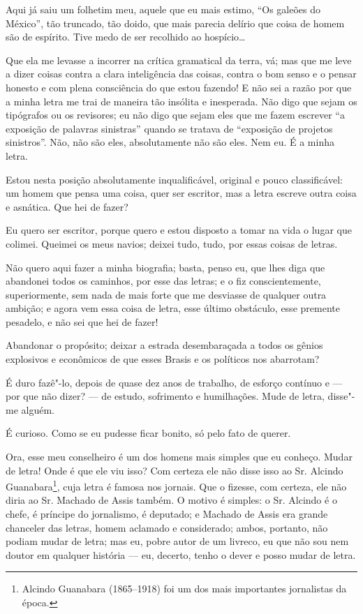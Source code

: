 Aqui já saiu um folhetim meu, aquele que eu mais estimo, ``Os galeões do
México'', tão truncado, tão doido, que mais parecia delírio que coisa de
homem são de espírito. Tive medo de ser recolhido ao hospício\ldots{}

Que ela me levasse a incorrer na crítica gramatical da terra, vá; mas
que me leve a dizer coisas contra a clara inteligência das coisas,
contra o bom senso e o pensar honesto e com plena consciência do que
estou fazendo! E não sei a razão por que a minha letra me trai de
maneira tão insólita e inesperada. Não digo que sejam os tipógrafos ou
os revisores; eu não digo que sejam eles que me fazem escrever ``a
exposição de palavras sinistras'' quando se tratava de ``exposição de
projetos sinistros''. Não, não são eles, absolutamente não são eles. Nem
eu. É a minha letra.

Estou nesta posição absolutamente inqualificável, original e pouco
classificável: um homem que pensa uma coisa, quer ser escritor, mas a
letra escreve outra coisa e asnática. Que hei de fazer?

Eu quero ser escritor, porque quero e estou disposto a tomar na vida o
lugar que colimei. Queimei os meus navios; deixei tudo, tudo, por essas
coisas de letras.

Não quero aqui fazer a minha biografia; basta, penso eu, que lhes diga
que abandonei todos os caminhos, por esse das letras; e o fiz
conscientemente, superiormente, sem nada de mais forte que me desviasse
de qualquer outra ambição; e agora vem essa coisa de letra, esse último
obstáculo, esse premente pesadelo, e não sei que hei de fazer!

Abandonar o propósito; deixar a estrada desembaraçada a todos os gênios
explosivos e econômicos de que esses Brasis e os políticos nos
abarrotam?

É duro fazê"-lo, depois de quase dez anos de trabalho, de esforço
contínuo e --- por que não dizer? --- de estudo, sofrimento e
humilhações. Mude de letra, disse"-me alguém.

É curioso. Como se eu pudesse ficar bonito, só pelo fato de querer.

Ora, esse meu conselheiro é um dos homens mais simples que eu conheço.
Mudar de letra! Onde é que ele viu isso? Com certeza ele não disse isso
ao Sr. Alcindo Guanabara\footnote{Alcindo Guanabara (1865--1918) foi
  um dos mais importantes jornalistas da época.}, cuja letra é famosa
nos jornais. Que o fizesse, com certeza, ele não diria ao Sr. Machado de
Assis também. O motivo é simples: o Sr. Alcindo é o chefe, é príncipe do
jornalismo, é deputado; e Machado de Assis era grande chanceler das
letras, homem aclamado e considerado; ambos, portanto, não podiam mudar
de letra; mas eu, pobre autor de um livreco, eu que não sou nem doutor
em qualquer história --- eu, decerto, tenho o dever e posso mudar de
letra.

